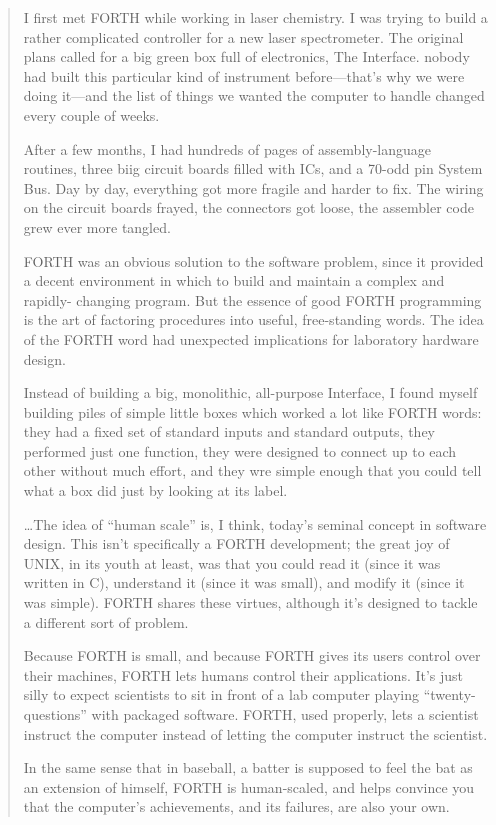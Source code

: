 \begin{quote}
I first met FORTH while working in laser chemistry.  I was trying to build a
rather complicated controller for a new laser spectrometer.  The original
plans called for a big green box full of electronics, The Interface.  nobody 
had built this particular kind of instrument before---that's why we were 
doing it---and the list of things we wanted the computer to handle changed
every couple of weeks.

After a few months, I had hundreds of pages of assembly-language 
routines, three biig circuit boards filled with ICs, and a 70-odd pin System
Bus.  Day by day, everything got more fragile and harder to fix.  The wiring 
on the circuit boards frayed, the connectors got loose, the assembler code
grew ever more tangled.

FORTH was an obvious solution to the software problem, since it provided
a decent environment in which to build and maintain a complex and rapidly-
changing program.  But the essence of good FORTH programming is the 
art of factoring procedures into useful, free-standing words.  The idea of the
FORTH word had unexpected implications for laboratory hardware design.

Instead of building a big, monolithic, all-purpose Interface, I found myself
building piles of simple little boxes which worked a lot like FORTH words:
they had a fixed set of standard inputs and standard outputs, they performed
just one function, they were designed to connect up to each other 
without much effort, and they wre simple enough that you could tell what 
a box did just by looking at its label.

\ldots The idea of ``human scale'' is, I think, today's seminal concept in 
software design.  This isn't specifically a FORTH development; the great joy of
UNIX, in its youth at least, was that you could read it (since it was written
in C), understand it (since it was small), and modify it (since it was simple).
FORTH shares these virtues, although it's designed to tackle a different 
sort of problem.

Because FORTH is small, and because FORTH gives its users control over
their machines, FORTH lets humans control their applications.  It's just
silly to expect scientists to sit in front of a lab computer playing ``twenty-
questions'' with packaged software.  FORTH, used properly, lets a scientist
instruct the computer instead of letting the computer instruct the scientist.

In the same sense that in baseball, a batter is supposed to feel the bat as an 
extension of himself, FORTH is human-scaled, and helps convince you that
the computer's achievements, and its failures, are also your own.
\end{quote}
